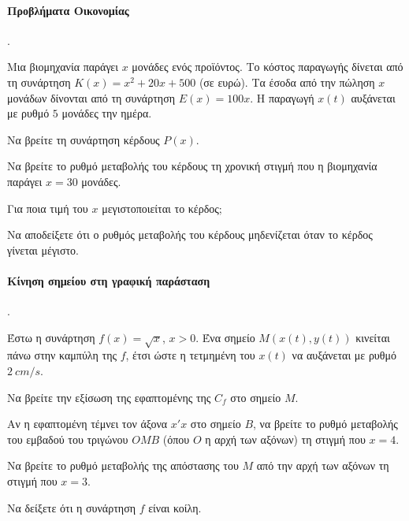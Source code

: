 \documentclass[11pt,a4paper,twocolumn]{article}
\newcounter{askhsh}
\newcommand{\askhsh}{\large\theaskhsh.\ \addtocounter{askhsh}{1}}
\begin{document}
\paragraph{Προβλήματα Οικονομίας}
\askhsh Μια βιομηχανία παράγει $x$ μονάδες ενός προϊόντος. Το κόστος παραγωγής δίνεται από τη συνάρτηση $K(x) = x^2 + 20x + 500$ (σε ευρώ). Τα έσοδα από την πώληση $x$ μονάδων δίνονται από τη συνάρτηση $E(x) = 100x$. Η παραγωγή $x(t)$ αυξάνεται με ρυθμό $5$ μονάδες την ημέρα.
\begin{alist}
\item Να βρείτε τη συνάρτηση κέρδους $P(x)$.
\item Να βρείτε το ρυθμό μεταβολής του κέρδους τη χρονική στιγμή που η βιομηχανία παράγει $x=30$ μονάδες.
\item Για ποια τιμή του $x$ μεγιστοποιείται το κέρδος;
\item Να αποδείξετε ότι ο ρυθμός μεταβολής του κέρδους μηδενίζεται όταν το κέρδος γίνεται μέγιστο.
\end{alist}

\paragraph{Κίνηση σημείου στη γραφική παράσταση}
\askhsh Έστω η συνάρτηση $f(x) = \sqrt{x}$, $x>0$. Ένα σημείο $M(x(t), y(t))$ κινείται πάνω στην καμπύλη της $f$, έτσι ώστε η τετμημένη του $x(t)$ να αυξάνεται με ρυθμό $2\ cm/s$.
\begin{alist}
\item Να βρείτε την εξίσωση της εφαπτομένης της $C_f$ στο σημείο $M$.
\item Αν η εφαπτομένη τέμνει τον άξονα $x'x$ στο σημείο $B$, να βρείτε το ρυθμό μεταβολής του εμβαδού του τριγώνου $OMB$ (όπου $O$ η αρχή των αξόνων) τη στιγμή που $x=4$.
\item Να βρείτε το ρυθμό μεταβολής της απόστασης του $M$ από την αρχή των αξόνων τη στιγμή που $x=3$.
\item Να δείξετε ότι η συνάρτηση $f$ είναι κοίλη.
\end{alist}

\begin{center}
\end{center}
\end{document}
